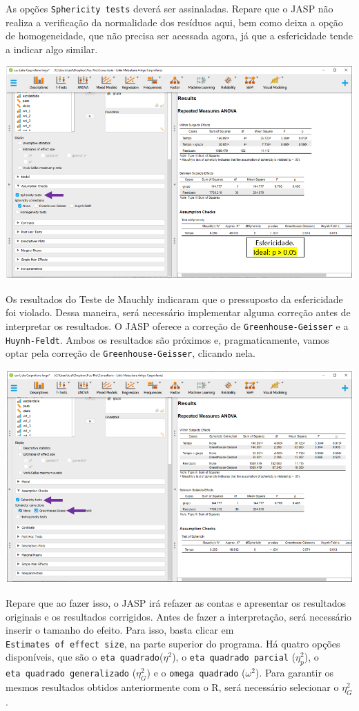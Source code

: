 \documentclass[
]{book}
\begin{document}
As opções \texttt{Sphericity\ tests} deverá ser assinaladas. Repare que o JASP não realiza a verificação da normalidade dos resíduos aqui, bem como deixa a opção de homogeneidade, que não precisa ser acessada agora, já que a esfericidade tende a indicar algo similar.

\includegraphics{./img/cap_anovarm_esfericidade.png}

Os resultados do Teste de Mauchly indicaram que o pressuposto da esfericidade foi violado. Dessa maneira, será necessário implementar alguma correção antes de interpretar os resultados. O JASP oferece a correção de \texttt{Greenhouse-Geisser} e a \texttt{Huynh-Feldt}. Ambos os resultados são próximos e, pragmaticamente, vamos optar pela correção de \texttt{Greenhouse-Geisser}, clicando nela.

\includegraphics{./img/cap_anovarm_esfericidade2.png}

Repare que ao fazer isso, o JASP irá refazer as contas e apresentar os resultados originais e os resultados corrigidos. Antes de fazer a interpretação, será necessário inserir o tamanho do efeito. Para isso, basta clicar em \texttt{Estimates\ of\ effect\ size}, na parte superior do programa. Há quatro opções disponíveis, que são o \texttt{eta\ quadrado}(\(\eta^2\)), o \texttt{eta\ quadrado\ parcial} (\(\eta^2_p\)), o \texttt{eta\ quadrado\ generalizado} (\(\eta^2_G\)) e o \texttt{omega\ quadrado} (\(\omega^2\)). Para garantir os mesmos resultados obtidos anteriormente com o R, será necessário selecionar o \(\eta^2_G\).
\end{document}
